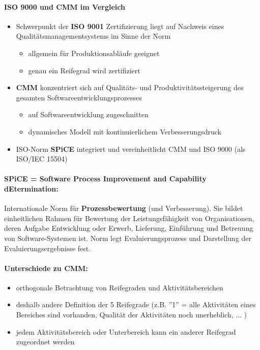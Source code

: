 \paragraph{ISO 9000 und CMM im Vergleich}
\begin{itemize}
	\item Schwerpunkt der \textbf{ISO 9001} Zertifizierung liegt auf Nachweis eines Qualitätsmanagementsystems im Sinne der Norm
	\begin{itemize}
		\item allgemein für Produktionsabläufe geeignet
		\item genau ein Reifegrad wird zertifiziert
	\end{itemize}
	\item \textbf{CMM} konzentriert sich auf Qualitäts- und Produktivitätssteigerung des gesamten Softwareentwicklungsprozesses
	\begin{itemize}
		\item auf Softwareentwicklung zugeschnitten
		\item dynamisches Modell mit kontinuierlichem Verbesserungsdruck
	\end{itemize}
	\item ISO-Norm \textbf{SPiCE} integriert und vereinheitlicht CMM und ISO 9000 (als ISO/IEC 15504)
\end{itemize}

\paragraph{SPiCE = Software Process Improvement and Capability dEtermination:}
Internationale Norm für \textbf{Prozessbewertung} (und Verbesserung). Sie bildet einheitlichen Rahmen für Bewertung der Leistungsfähigkeit von Organisationen, deren Aufgabe Entwicklung oder Erwerb, Lieferung, Einführung und Betreuung von Software-Systemen ist. Norm legt Evaluierungsprozess und Darstellung der Evaluierungsergebnisse fest.

\paragraph{Unterschiede zu CMM:}
\begin{itemize}
	\item orthogonale Betrachtung von Reifegraden und Aktivitätsbereichen
	\item deshalb andere Definition der 5 Reifegrade (z.B. ''1'' = alle Aktivitäten eines Bereiches sind vorhanden, Qualität der Aktivitäten noch unerheblich, ... )
	\item jedem Aktivitätsbereich oder Unterbereich kann ein anderer Reifegrad zugeordnet werden
\end{itemize}

